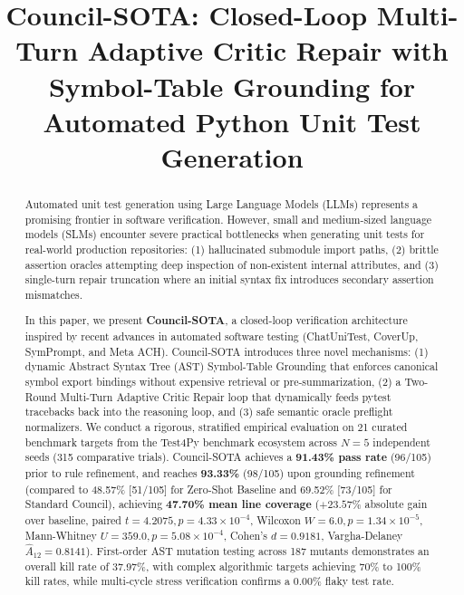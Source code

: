 \documentclass[conference]{IEEEtran}
\begin{document}
\title{Council-SOTA: Closed-Loop Multi-Turn Adaptive Critic Repair with Symbol-Table Grounding for Automated Python Unit Test Generation}

\author{
}

\maketitle

\begin{abstract}
Automated unit test generation using Large Language Models (LLMs) represents a promising frontier in software verification. However, small and medium-sized language models (SLMs) encounter severe practical bottlenecks when generating unit tests for real-world production repositories: (1) hallucinated submodule import paths, (2) brittle assertion oracles attempting deep inspection of non-existent internal attributes, and (3) single-turn repair truncation where an initial syntax fix introduces secondary assertion mismatches. 

In this paper, we present \textbf{Council-SOTA}, a closed-loop verification architecture inspired by recent advances in automated software testing (ChatUniTest, CoverUp, SymPrompt, and Meta ACH). Council-SOTA introduces three novel mechanisms: (1) dynamic Abstract Syntax Tree (AST) Symbol-Table Grounding that enforces canonical symbol export bindings without expensive retrieval or pre-summarization, (2) a Two-Round Multi-Turn Adaptive Critic Repair loop that dynamically feeds pytest tracebacks back into the reasoning loop, and (3) safe semantic oracle preflight normalizers. We conduct a rigorous, stratified empirical evaluation on 21 curated benchmark targets from the Test4Py benchmark ecosystem across $N=5$ independent seeds (315 comparative trials). Council-SOTA achieves a \textbf{91.43\% pass rate} (96/105) prior to rule refinement, and reaches \textbf{93.33\%} (98/105) upon grounding refinement (compared to 48.57\% [51/105] for Zero-Shot Baseline and 69.52\% [73/105] for Standard Council), achieving \textbf{47.70\% mean line coverage} ($+23.57\%$ absolute gain over baseline, paired $t = 4.2075, p = 4.33 \times 10^{-4}$, Wilcoxon $W = 6.0, p = 1.34 \times 10^{-5}$, Mann-Whitney $U = 359.0, p = 5.08 \times 10^{-4}$, Cohen's $d = 0.9181$, Vargha-Delaney $\hat{A}_{12} = 0.8141$). First-order AST mutation testing across 187 mutants demonstrates an overall kill rate of 37.97\%, with complex algorithmic targets achieving 70\% to 100\% kill rates, while multi-cycle stress verification confirms a 0.00\% flaky test rate.
\end{abstract}
\end{document}
